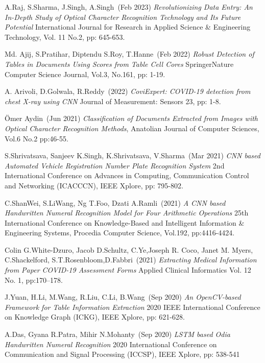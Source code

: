 \begin{thebibliography}{999}

A.Raj, S.Sharma, J.Singh, A.Singh~(Feb 2023) 
{\it Revolutionizing Data Entry: An In-Depth Study of Optical Character Recognition Technology and Its Future Potential} International Journal for Research in Applied Science \& Engineering Technology, Vol. 11 No.2, pp: 645-653.

Md. Ajij, S.Pratihar, Diptendu S.Roy, T.Hanne~(Feb 2022)
{\it Robust Detection of Tables in Documents Using Scores from Table Cell Cores}
SpringerNature Computer Science Journal, Vol.3, No.161, pp: 1-19.

A. Arivoli, D.Golwala, R.Reddy~(2022)
{\it CoviExpert: COVID-19 detection from chest X-ray using CNN} 
Journal of Measurement: Sensors 23, pp: 1-8.

Ömer Aydin~(Jun 2021) 
{\it Classification of Documents Extracted from Images with Optical Character Recognition Methods}, 
Anatolian Journal of Computer Sciences, Vol.6 No.2 pp:46-55.

S.Shrivatsava, Sanjeev K.Singh, K.Shrivatsava, V.Sharma~(Mar 2021)
{\it CNN based Automated Vehicle Registration Number Plate Recognition System} 
2nd International Conference on Advances in Computing, Communication Control and Networking (ICACCCN), IEEE Xplore, pp: 795-802.

C.ShanWei, S.LiWang, Ng T.Foo, Dzati A.Ramli~(2021)
{\it A CNN based Handwritten Numeral Recognition Model for Four Arithmetic Operations}
25th International Conference on Knowledge-Based and Intelligent Information \& Engineering
Systems, Procedia Computer Science, Vol.192, pp:4416-4424.

\clearpage

Colin G.White-Dzuro, Jacob D.Schultz, C.Ye,Joseph R. Coco, Janet M. Myers, C.Shackelford, S.T.Rosenbloom,D.Fabbri~(2021)
{\it Extracting Medical Information from Paper COVID-19 Assessment Forms} 
Applied Clinical Informatics Vol. 12 No. 1, pp:170–178.

J.Yuan, H.Li, M.Wang, R.Liu, C.Li, B.Wang~(Sep 2020)
{\it An OpenCV-based Framework for Table Information Extraction}
2020 IEEE International Conference on Knowledge Graph (ICKG), IEEE Xplore, pp: 621-628.

A.Das, Gyana R.Patra, Mihir N.Mohanty~(Sep 2020)
{\it LSTM based Odia Handwritten Numeral Recognition} 
2020 International Conference on Communication and Signal Processing (ICCSP), IEEE Xplore, pp: 538-541


\end{thebibliography}
